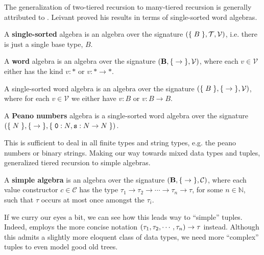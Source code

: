 The generalization of two-tiered recursion to many-tiered recursion is
generally attributed to \cite{leivant-1995}. Leivant proved his results in
terms of single-sorted word algebras.

\begin{definition} A \textbf{single-sorted} algebra is an algebra over the
signature ${\mathopen{}\left({\mathopen{}\left\{\mathrel{}{B}\mathrel{}\right\}\mathclose{}, \mathcal{T}, \mathcal{V}}\right)\mathclose{}}$, i.e. there is just a single
base type, $B$. \end{definition}

\begin{definition} A \textbf{word} algebra is an algebra over the signature
${\mathopen{}\left({\mathbf{B}, \mathopen{}\left\{\mathrel{}{\rightarrow}\mathrel{}\right\}\mathclose{}, \mathcal{V}}\right)\mathclose{}}$, where each $v \in
\mathcal{V}$ either has the kind $v : *$ or $v : *\rightarrow *$.
\end{definition}

\begin{example} A single-sorted word algebra is an algebra over the signature
${\mathopen{}\left({\mathopen{}\left\{\mathrel{}{B}\mathrel{}\right\}\mathclose{},\mathopen{}\left\{\mathrel{}{\rightarrow}\mathrel{}\right\}\mathclose{}, \mathcal{V}}\right)\mathclose{}}$, where for each $v \in
\mathcal{V}$ we either have $v : B$ or $v : B\rightarrow B$. \end{example}

\begin{definition} A \textbf{Peano numbers} algebra is a single-sorted word
algebra over the signature ${\mathopen{}\left({\mathopen{}\left\{\mathrel{}{N}\mathrel{}\right\}\mathclose{}, \mathopen{}\left\{\mathrel{}{\rightarrow}\mathrel{}\right\}\mathclose{},\mathopen{}\left\{\mathrel{}{\mathtt{0} : N,
\mathtt{s} : N \rightarrow N}\mathrel{}\right\}\mathclose{}}\right)\mathclose{}}$. \end{definition}


This is sufficient to deal in all finite types and string types, e.g.  the
peano numbers or binary strings. Making our way towards mixed data types and
tuples, \cite{marion-2003} generalized tiered recursion to simple algebras.
 
\begin{definition} A \textbf{simple algebra} is an algebra over the signature
${\mathopen{}\left({\mathbf{B}, \mathopen{}\left\{\mathrel{}{\rightarrow}\mathrel{}\right\}\mathclose{}, \mathcal{C}}\right)\mathclose{}}$, where each value constructor
$c \in \mathcal{C}$ has the type $\tau_1 \rightarrow \tau_2 \rightarrow \cdots
\rightarrow \tau_n \rightarrow \tau$, for some $n\in \mathbb{N}$, such that
$\tau$ occurs at most once amongst the $\tau_i$.  \end{definition}

If we curry our eyes a bit, we can see how this leads way to ``simple'' tuples.
Indeed, \cite{marion-2003} employs the more concise notation
${\mathopen{}\left({\tau_1,\tau_2,\cdots,\tau_n}\right)\mathclose{}}\rightarrow \tau$ instead.  Although this
admits a slightly more eloquent class of data types, we need more ``complex''
tuples to even model good old trees.

